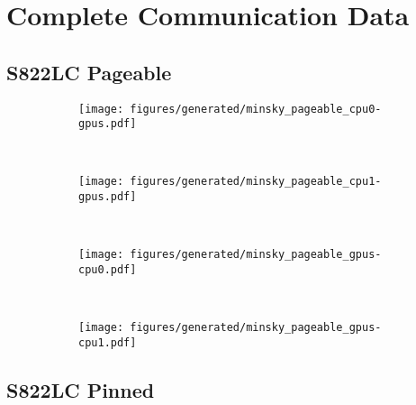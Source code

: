 \chapter{Complete Communication Data}
\label{ch:data}

\section{S822LC Pageable}

\begin{figure}[H]
    \centering
    \begin{subfigure}[b]{0.45\textwidth}
        \texttt{[image: figures/generated/minsky\_pageable\_cpu0-gpus.pdf]}
        \caption{}
        \label{}
    \end{subfigure}
    ~
    \begin{subfigure}[b]{0.45\textwidth}
        \texttt{[image: figures/generated/minsky\_pageable\_cpu1-gpus.pdf]}
        \caption{}
        \label{}
    \end{subfigure}
    \\
    \begin{subfigure}[b]{0.45\textwidth}
        \texttt{[image: figures/generated/minsky\_pageable\_gpus-cpu0.pdf]}
        \caption{}
        \label{}
    \end{subfigure}
    ~
    \begin{subfigure}[b]{0.45\textwidth}
        \texttt{[image: figures/generated/minsky\_pageable\_gpus-cpu1.pdf]}
        \caption{}
        \label{}
    \end{subfigure}
    \caption[]{}
    \label{fig:data-minsky-pageable}
\end{figure}

\section{S822LC Pinned}

